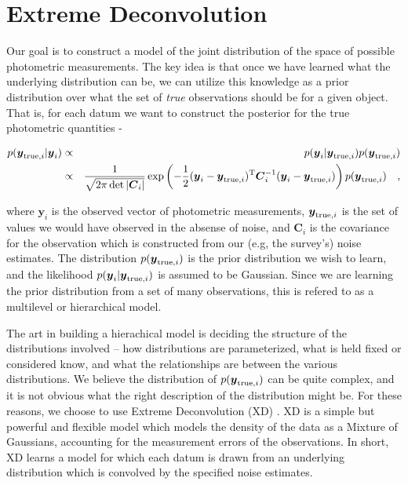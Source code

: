 \documentclass[12pt,preprint]{aastex}
\newcommand{\datavector}[1]{\boldsymbol{#1}}
\newcommand{\data}{\datavector{y}}
\newcommand{\datum}{\data_i}
\newcommand{\truedatum}{\data_{{\rm true}, i}}
\newcommand{\datacov}{\datavector{C}}
\newcommand{\datumcov}{\datacov_i}
\newcommand{\transpose}{{\rm T}}
\begin{document}
%
%
\section{Extreme Deconvolution}

Our goal is to construct a model of the joint distribution of the space of
possible photometric measurements.  The key idea is that once we have learned
what the underlying distribution can be, we can utilize this knowledge as a
prior distribution over what the set of \emph{true} observations should be for
a given object.  That is, for each datum we want to construct the posterior
for the true photometric quantities -

\begin{eqnarray}\displaystyle
p(\truedatum | \datum) & \propto & p(\datum | \truedatum) p(\truedatum) \\
                                         & \propto & \frac{1}{\sqrt{2\pi\det{|\datumcov|}}} \exp \left (-\frac{1}{2}(\datum - \truedatum)^\transpose \datumcov^{-1}(\datum - \truedatum) \right ) p(\truedatum)
\quad ,
\label{eqn:posterior}
\end{eqnarray}

\noindent where $\datum$ is the observed vector of photometric measurements, 
$\truedatum$ is the set of values we would have observed in the absense of
noise, and $\datumcov$ is the covariance for the observation which is
constructed from our (e.g, the survey's) noise estimates.  The distribution 
$p(\truedatum)$ is the prior distribution we wish to learn, and the likelihood
$p(\datum | \truedatum)$ is assumed to be Gaussian.  Since we are learning the
prior distribution from a set of many observations, this is refered to as a
multilevel or hierarchical model.

The art in building a hierachical model is deciding the structure of the
distributions involved -- how distributions are parameterized, what is held
fixed or considered know, and what the relationships are between the various
distributions.  We believe the distribution of $p(\truedatum)$ can be quite 
complex, and it is not obvious what the right description of the distribution
might be.  For these reasons, we choose to use Extreme Deconvolution (XD)
\citep{bovy09}.  XD is a simple but powerful and flexible model which models
the density of the data as a Mixture of Gaussians, accounting for the 
measurement errors of the observations.  In short, XD learns a model for which 
each datum is drawn from an underlying distribution which is convolved by the 
specified noise estimates.
\end{document}
